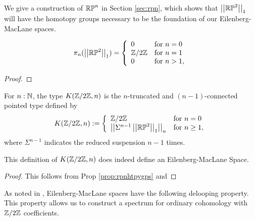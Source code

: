 \documentclass{amsart}
\begin{document}
We give a construction of $\mathbb{RP}^n$ in Section \ref{sec:rpn}, which shows that $\left| \left| \mathbb{RP}^2\right| \right|_1$ will have the homotopy groups necessary to be the foundation of our Eilenberg-MacLane spaces. 
\begin{proposition}\label{prop:rpnhtpygps} %
	\[ \pi_n(\left| \left| \mathbb{RP}^2\right| \right|_1)=\left\{ \begin{array}{ll} 0 & \text{for }n=0\\
	\mathbb{Z}/2\mathbb{Z} & \text{for } n=1\\
	0 & \text{for } n> 1, 
	\end{array}\right.\]
\end{proposition}
\begin{proof}
\end{proof}

\begin{definition}\label{def:EM-space}
	For $n:\mathbb{N}$, the type  $K(\mathbb{Z}/2\mathbb{Z},n)$ is the $n$-truncated and $(n-1)$-connected pointed type defined by
	\[ K(\mathbb{Z}/2\mathbb{Z},n):=\left\{ \begin{array}{ll} \mathbb{Z}/2\mathbb{Z} & \text{for }n=0\\
	\left| \left| \Sigma^{n-1}\left| \left| \mathbb{RP}^2\right| \right|_1\right| \right|_n & \text{for } n\ge 1, 
	\end{array}\right.\]
	where $\Sigma^{n-1}$ indicates the reduced suspension $n-1$ times. 
\end{definition}

\begin{proposition}
	This definition of $K(\mathbb{Z}/2\mathbb{Z},n)$ does indeed define an Eilenberg-MacLane Space. 
\end{proposition}

\begin{proof} This follows from Prop \ref{prop:rpnhtpygps} and
\end{proof}



As noted in \cite{fl:em}, Eilenberg-MacLane spaces have the following delooping property. This property allows us to construct a spectrum for ordinary cohomology with $\mathbb{Z}/2\mathbb{Z}$ coefficients. 
\end{document}
